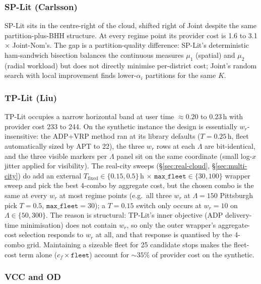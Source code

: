 \subsubsection{SP-Lit (Carlsson)}

SP-Lit sits in the centre-right of the cloud, shifted right of Joint despite the same partition-plus-BHH structure. At every regime point its provider cost is 1.6 to 3.1$\times$ Joint-Nom's. The gap is a partition-quality difference: SP-Lit's deterministic ham-sandwich bisection balances the continuous measures $\mu_1$ (spatial) and $\mu_2$ (radial workload) but does not directly minimise per-district cost; Joint's random search with local improvement finds lower-$\alpha_i$ partitions for the same $K$.

\subsubsection{TP-Lit (Liu)}\label{sec:tplit-cloud}

TP-Lit occupies a narrow horizontal band at user time $\approx 0.20$ to $0.23$\,h with provider cost 233 to 244. On the synthetic instance the design is essentially $w_r$-insensitive: the ADP+VRP method ran at its library defaults ($T{=}0.25$\,h, fleet automatically sized by APT to 22), the three $w_r$ rows at each $\Lambda$ are bit-identical, and the three visible markers per $\Lambda$ panel sit on the same coordinate (small log-$x$ jitter applied for visibility). The real-city sweeps (\S\ref{sec:real-cloud}, \S\ref{sec:multi-city}) do add an external $T_{\mathrm{fixed}} \in \{0.15, 0.5\}$\,h $\times$ $\mathtt{max\_fleet} \in \{30, 100\}$ wrapper sweep and pick the best 4-combo by aggregate cost, but the chosen combo is the same at every $w_r$ at most regime points (e.g.\ all three $w_r$ at $\Lambda{=}150$ Pittsburgh pick $T{=}0.5$, $\mathtt{max\_fleet}{=}30$); a $T{=}0.15$ switch only occurs at $w_r{=}10$ on $\Lambda \in \{50, 300\}$. The reason is structural: TP-Lit's inner objective (ADP delivery-time minimisation) does not contain $w_r$, so only the outer wrapper's aggregate-cost selection responds to $w_r$ at all, and that response is quantised by the 4-combo grid. Maintaining a sizeable fleet for 25 candidate stops makes the fleet-cost term alone ($c_f \times \mathtt{fleet}$) account for $\sim 35\%$ of provider cost on the synthetic.

\subsubsection{VCC and OD}

